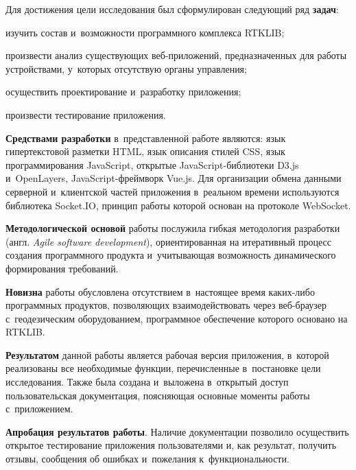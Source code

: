 Для достижения цели исследования был сформулирован следующий ряд \textbf{задач}:

\begin{dashitemize}
  \item изучить состав и~возможности программного комплекса RTKLIB;
  \item произвести анализ существующих веб-приложений, предназначенных для работы устройствами, у~которых отсутствую органы управления;
  \item осуществить проектирование и~разработку приложения;
  \item произвести тестирование приложения.
\end{dashitemize}

\textbf{Средствами разработки} в~представленной работе являются: язык гипертекстовой разметки HTML, язык описания стилей CSS, язык программирования JavaScript, открытые JavaScript-библиотеки D3.js и~OpenLayers, JavaScript-фреймворк Vue.js. Для организации обмена данными серверной и~клиентской частей приложения в~реальном времени используются библиотека Socket.IO, принцип работы которой основан на протоколе WebSocket. \par

\textbf{Методологической основой} работы послужила гибкая методология разработки (англ. \emph{Agile software development}), ориентированная на итеративный процесс создания программного продукта и~учитывающая возможность динамического формирования требований. \par

\textbf{Новизна} работы обусловлена отсутствием в~настоящее время каких-либо программных продуктов, позволяющих взаимодействовать через веб-браузер с~геодезическим оборудованием, программное обеспечение которого основано на RTKLIB. \par

\textbf{Результатом} данной работы является рабочая версия приложения, в~которой реализованы все необходимые функции, перечисленные в~постановке цели исследования. Также была создана и~выложена в~открытый доступ пользовательская документация, поясняющая основные моменты работы с~приложением. \par

\textbf{Апробация результатов работы}. Наличие документации позволило осуществить открытое тестирование приложения пользователями и, как результат, получить отзывы, сообщения об ошибках и~пожелания к~функциональности.

\newpage
